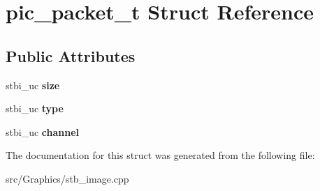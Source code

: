 \hypertarget{structpic__packet__t}{\section{pic\+\_\+packet\+\_\+t Struct Reference}
\label{structpic__packet__t}
}
\subsection*{Public Attributes}
\begin{DoxyCompactItemize}
\item 
\hypertarget{structpic__packet__t_ad33021e40c272a20d89bdcceabb20a71}{stbi\+\_\+uc {\bfseries size}}\label{structpic__packet__t_ad33021e40c272a20d89bdcceabb20a71}

\item 
\hypertarget{structpic__packet__t_abc346cfdcff43f051830335296f14aaa}{stbi\+\_\+uc {\bfseries type}}\label{structpic__packet__t_abc346cfdcff43f051830335296f14aaa}

\item 
\hypertarget{structpic__packet__t_af64f17c991495f3f3baf6782a253f7cc}{stbi\+\_\+uc {\bfseries channel}}\label{structpic__packet__t_af64f17c991495f3f3baf6782a253f7cc}

\end{DoxyCompactItemize}


The documentation for this struct was generated from the following file\+:\begin{DoxyCompactItemize}
\item 
src/\+Graphics/stb\+\_\+image.\+cpp\end{DoxyCompactItemize}
